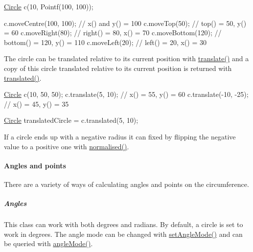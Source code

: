 \begin{DoxyCode}
\hyperlink{classprism_1_1geometry_1_1_circle_a7d9e34947cf139b50f5730ed7711b4a4}{Circle} c(10, Pointf(100, 100));

c.moveCentre(100, 100); \textcolor{comment}{// x() and y() = 100}
c.moveTop(50);          \textcolor{comment}{// top() = 50, y() = 60}
c.moveRight(80);        \textcolor{comment}{// right() = 80, x() = 70}
c.moveBottom(120);      \textcolor{comment}{// bottom() = 120, y() = 110}
c.moveLeft(20);         \textcolor{comment}{// left() = 20, x() = 30}
\end{DoxyCode}


The circle can be translated relative to its current position with \hyperlink{classprism_1_1geometry_1_1_circle_a594995da05e613977b0c7bd85528753b}{translate()} and a copy of this circle translated relative to its current position is returned with \hyperlink{classprism_1_1geometry_1_1_circle_a77cb41b6ca766b3871c352dd1cc33727}{translated()}.


\begin{DoxyCode}
\hyperlink{classprism_1_1geometry_1_1_circle_a7d9e34947cf139b50f5730ed7711b4a4}{Circle} c(10, 50, 50);
c.translate(5, 10); \textcolor{comment}{// x() = 55, y() = 60}
c.translate(-10, -25); \textcolor{comment}{// x() = 45, y() = 35}

\hyperlink{classprism_1_1geometry_1_1_circle_a7d9e34947cf139b50f5730ed7711b4a4}{Circle} translatedCircle = c.translated(5, 10);
\end{DoxyCode}


If a circle ends up with a negative radius it can fixed by flipping the negative value to a positive one with \hyperlink{classprism_1_1geometry_1_1_circle_adebf8895998188cfc637b6541121950b}{normalised()}.

\paragraph*{Angles and points}

There are a variety of ways of calculating angles and points on the circumference.

\subparagraph*{Angles}

This class can work with both degrees and radians. By default, a circle is set to work in degrees. The angle mode can be changed with \hyperlink{classprism_1_1geometry_1_1_circle_a8a77497a3f3ba3283fd80c0b8830753f}{set\+Angle\+Mode()} and can be queried with \hyperlink{classprism_1_1geometry_1_1_circle_a3faa81cb65a95da1a8e31442d19beb94}{angle\+Mode()}.


